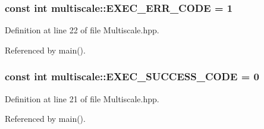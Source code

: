 \hypertarget{namespacemultiscale_aa7639e216821c93df25ffa95f5d140f0}{
\subsubsection[{E\-X\-E\-C\-\_\-\-E\-R\-R\-\_\-\-C\-O\-D\-E}]{\setlength{\rightskip}{0pt plus 5cm}const int multiscale\-::\-E\-X\-E\-C\-\_\-\-E\-R\-R\-\_\-\-C\-O\-D\-E = 1}}\label{namespacemultiscale_aa7639e216821c93df25ffa95f5d140f0}


Definition at line 22 of file Multiscale.\-hpp.



Referenced by main().

\hypertarget{namespacemultiscale_af1a144a9112490c157ff445b56e322b2}{
\subsubsection[{E\-X\-E\-C\-\_\-\-S\-U\-C\-C\-E\-S\-S\-\_\-\-C\-O\-D\-E}]{\setlength{\rightskip}{0pt plus 5cm}const int multiscale\-::\-E\-X\-E\-C\-\_\-\-S\-U\-C\-C\-E\-S\-S\-\_\-\-C\-O\-D\-E = 0}}\label{namespacemultiscale_af1a144a9112490c157ff445b56e322b2}


Definition at line 21 of file Multiscale.\-hpp.



Referenced by main().

